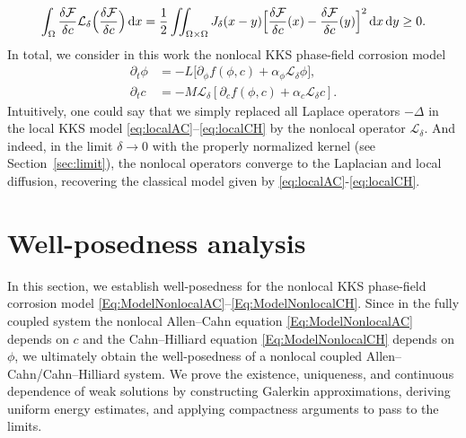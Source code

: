 \documentclass[]{article}
\newcommand{\dx}{\,\textup{d}x}
\newcommand{\dy}{\,\textup{d}y}
\begin{document}
\[
\int_{\Omega} \frac{\delta \mathcal{F}}{\delta c}\mathcal{L}_\delta\Bigl(\frac{\delta \mathcal{F}}{\delta c}\Bigr)\dx
= \frac{1}{2}\iint_{\Omega\times\Omega} J_{\delta}(x-y)\Bigl[\frac{\delta \mathcal{F}}{\delta c}(x)
- \frac{\delta \mathcal{F}}{\delta c}(y)\Bigr]^2\dx\dy
\ge0.
\]
In total, we consider in this work the nonlocal KKS phase-field corrosion model
\begin{align} \label{Eq:ModelNonlocalAC}
	\partial_t \phi
	&= -L\bigl[\partial_\phi f(\phi,c)
	+ \alpha_{\phi}\mathcal{L}_\delta \phi \bigr], \\ \label{Eq:ModelNonlocalCH}\partial_t c &= -M \mathcal{L}_\delta[\partial_c f(\phi,c)+\alpha_c \mathcal{L}_\delta c].
\end{align}
Intuitively, one could say that we simply replaced all Laplace operators $-\Delta$ in the local KKS model \eqref{eq:localAC}--\eqref{eq:localCH} by the nonlocal operator $\mathcal{L}_\delta$. And indeed,
in the limit \(\delta\to0\) with the properly normalized kernel (see Section~\ref{sec:limit}), the nonlocal operators converge to the Laplacian and local diffusion, recovering the classical model given by \eqref{eq:localAC}-\eqref{eq:localCH}.


\section{Well-posedness analysis} 
\label{sec:wellposed_analysis}
In this section, we establish well-posedness for the nonlocal KKS phase-field corrosion model \eqref{Eq:ModelNonlocalAC}--\eqref{Eq:ModelNonlocalCH}.  Since in the fully coupled system the nonlocal Allen--Cahn equation \eqref{Eq:ModelNonlocalAC} depends on \(c\) and the Cahn--Hilliard equation \eqref{Eq:ModelNonlocalCH} depends on \(\phi\), we ultimately obtain the well-posedness of a nonlocal coupled Allen--Cahn/Cahn--Hilliard system. We prove the existence, uniqueness, and continuous dependence of weak solutions by constructing Galerkin approximations, deriving uniform energy estimates, and applying compactness arguments to pass to the limits. 
\end{document}
